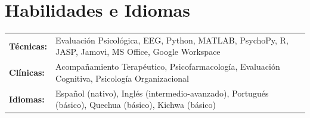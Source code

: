 \documentclass[11pt,letterpaper]{article}
\begin{document}
\section{Habilidades e Idiomas}

\begin{tabularx}{\textwidth}{@{}l X@{}}
\textbf{Técnicas:} & Evaluación Psicológica, EEG, Python, MATLAB, PsychoPy, R, JASP, Jamovi, MS Office, Google Workspace \\
\textbf{Clínicas:} & Acompañamiento Terapéutico, Psicofarmacología, Evaluación Cognitiva, Psicología Organizacional \\
\textbf{Idiomas:} & Español (nativo), Inglés (intermedio-avanzado), Portugués (básico), Quechua (básico), Kichwa (básico) \\
\end{tabularx}
\end{document}

